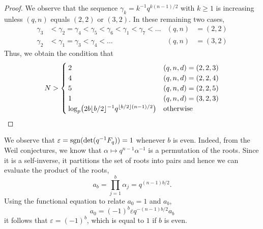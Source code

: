 \begin{proof}
We observe that the sequence $\gamma_k = k^{-1} q^{k (n - 1) / 2}$ 
with $k \geq 1$ is increasing unless $(q,n)$ equals $(2,2)$ or $(3,2)$.  
In these remaining two cases, 
\begin{align*}
\gamma_3 & < \gamma_2 = \gamma_4 < \gamma_5 < \gamma_6 < \gamma_1 < \gamma_7 < \dotsc & (q,n) & = (2,2) \\
\gamma_2 & < \gamma_1 = \gamma_3 < \gamma_4 < \dotsc & (q,n) & = (3,2)
\end{align*}
Thus, we obtain the condition that 
\begin{equation*}
N > \begin{cases}
    2 & (q,n,d) = (2,2,3) \\
    4 & (q,n,d) = (2,2,4) \\
    5 & (q,n,d) = (2,2,5) \\
    1 & (q,n,d) = (3,2,3) \\
    \log_p \bigl( 2 b \lfloor b/2\rfloor^{-1} q^{\left\lfloor b/2\right\rfloor (n - 1) / 2} \bigr) & \text{otherwise}
    \end{cases}
\end{equation*}
\end{proof}

\begin{rem}
We observe that $\varepsilon = \operatorname{sgn}(\det(q^{-1} F_q)) = 1$ whenever $b$ is even.
Indeed, from the Weil conjectures, we know that $\alpha \mapsto q^{n-1} \alpha^{-1}$ 
is a permutation of the roots.  Since it is a self-inverse, it partitions the 
set of roots into pairs and hence we can evaluate the product of the roots,
\begin{equation*}
a_b = \prod_{j=1}^{b} \alpha_j = q^{(n-1)b/2}.
\end{equation*}
Using the functional equation to relate $a_0 = 1$ and $a_b$, 
\begin{equation*}
a_{0} = (-1)^{b} \varepsilon q^{-(n-1) b / 2} a_{b}
\end{equation*}
it follows that $\varepsilon = (-1)^b$, which is equal to $1$ if $b$ is even.
\end{rem}


